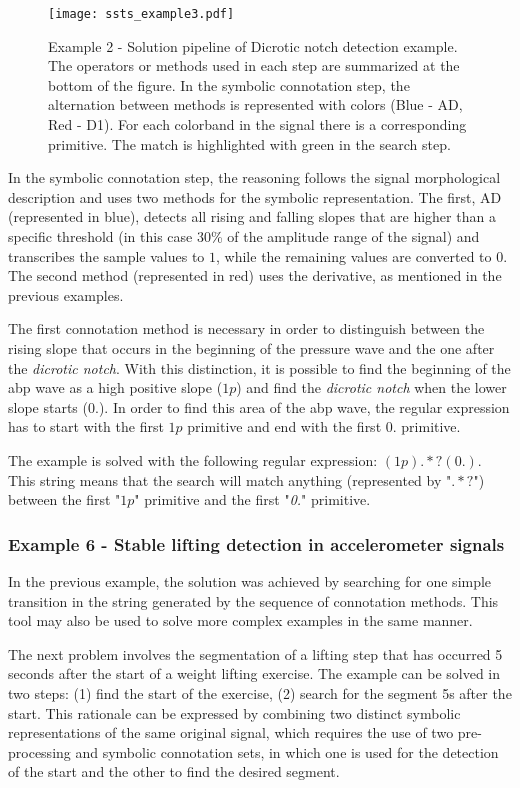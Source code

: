 \begin{figure}[H]
  \centering
      \texttt{[image: ssts\_example3.pdf]}
  \caption{Example 2 - Solution pipeline of Dicrotic notch detection example. The operators or methods used in each step are summarized at the bottom of the figure. In the symbolic connotation step, the alternation between methods is represented with colors (Blue - AD, Red - D1). For each colorband in the signal there is a corresponding primitive. The match is highlighted with green in the search step.}
  \label{fig:Exercise3}
\end{figure}

In the symbolic connotation step, the reasoning follows the signal morphological description and uses two methods for the symbolic representation. The first, AD (represented in blue), detects all rising and falling slopes that are higher than a specific threshold (in this case 30\% of the amplitude range of the signal) and transcribes the sample values to $1$, while the remaining values are converted to $0$. The second method (represented in red) uses the derivative, as mentioned in the previous examples.
\par
The first connotation method is necessary in order to distinguish between the rising slope that occurs in the beginning of the pressure wave and the one after the \textit{dicrotic notch}. With this distinction, it is possible to find the beginning of the \gls{abp} wave as a high positive slope ($1p$) and find the \textit{dicrotic notch} when the lower slope starts ($0.$). In order to find this area of the \gls{abp} wave, the regular expression has to start with the first $1p$ primitive and end with the first $0.$ primitive. 

\par
The example is solved with the following regular expression: $(1p).*?(0.)$. This string means that the search will match anything (represented by "$.*?$") between the first "$1p$" primitive and the first "\textit{0.}" primitive.

\subsubsection{Example 6 - Stable lifting detection in accelerometer signals}

In the previous example, the solution was achieved by searching for one simple transition in the string generated by the sequence of connotation methods. This tool may also be used to solve more complex examples in the same manner.
\par
The next problem involves the segmentation of a lifting step that has occurred 5 seconds after the start of a weight lifting exercise. The example can be solved in two steps: (1) find the start of the exercise, (2) search for the segment 5s after the start. This rationale can be expressed by combining two distinct symbolic representations of the same original signal, which requires the use of two pre-processing and symbolic connotation sets, in which one is used for the detection of the start and the other to find the desired segment.

